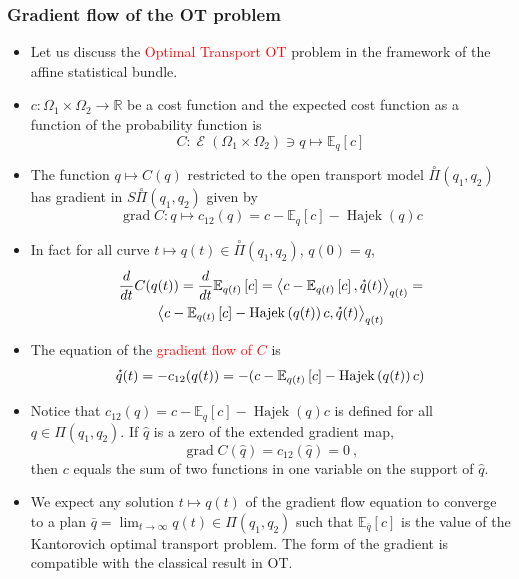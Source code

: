 \documentclass[xcolor=svgnames]{beamer}
\DeclareMathOperator{\Hajek}{Hajek}
\DeclareMathOperator{\Maxexp}{\mathcal E}
\DeclareMathOperator{\grad}{grad}
\newcommand{\derivby}[1]{\frac{d}{d#1}}
\newcommand{\expectat}[2]{\mathbb E_{#1}\left[#2\right]}
\newcommand{\hajekof}[1]{\Hajek\left(#1\right)}
\newcommand{\maxexpat}[1]{\Maxexp\left(#1\right)}
\newcommand{\openplan}[2]{\overset{\circ}\Pi\left(#1,#2\right)}
\newcommand{\reals}{\mathbb{R}}
\newcommand{\rosso}[1]{\textcolor{red}{#1}}
\newcommand{\scalarat}[3]{\left\langle#2,#3\right\rangle_{#1}}
\newcommand{\velocity}[1]{\accentset{\star}{#1}}
\renewcommand{\emph}{\rosso}
\begin{document}
\begin{frame}\small\frametitle{Gradient flow of the OT problem}

\begin{itemize}
    \item 
Let us discuss the \emph{Optimal Transport OT} problem in the framework of the affine statistical bundle.
\item $c \colon \Omega_1 \times \Omega_2 \to \reals$ be a cost function and the expected cost function as a function of the probability function is
\begin{equation*}
  C \colon \maxexpat {\Omega_1 \times \Omega_2} \ni q \mapsto \expectat q c
\end{equation*}
\item The function $q \mapsto C(q)$ restricted to the open transport model $\openplan{q_1}{q_2}$ has gradient in $S\openplan{q_1}{q_2}$ given by
\begin{equation*}
 \grad C \colon q \mapsto c_{12}(q) = c - \expectat q c - \hajekof q c 
\end{equation*}
\item In fact for all curve $t \mapsto q(t) \in \openplan {q_1}{q_2}$, $q(0) = q$,
\begin{multline*}
\derivby t C(q(t)) = \derivby t \expectat {q(t)} c = \scalarat {q(t)} {c - \expectat {q(t)} c}{\velocity q(t)} = \\
\scalarat {q(t)} {c - \expectat {q(t)} c - \hajekof {q(t)} c}{\velocity q(t)}
\end{multline*}

\item The equation of the \emph{gradient flow of $C$} is
\begin{equation*}
  \velocity q(t) = - c_{12}(q(t)) = - (c - \expectat {q(t)} c - \hajekof {q(t)} c)
\end{equation*}

\item Notice that  $c_{12}(q) = c - \expectat q c - \hajekof {q} c$ is defined for  all $q \in \Pi(q_1,q_2)$. If $\hat q$ is a zero of the extended gradient map,
\begin{equation*}
    \grad C(\hat q) = c_{12}(\hat q) = 0 \ ,
\end{equation*}
then $c$ equals the sum of two functions in one variable on the support of $\hat q$.
\item
We expect any solution $t \mapsto q(t)$ of the gradient flow equation to converge to a plan $\bar q = \lim_{t \to \infty} q(t) \in \Pi(q_1,q_2)$ such that $\expectat {\bar q} c$ is the value of the Kantorovich optimal transport problem. The form of the gradient is compatible with the classical result in OT.
\end{itemize}
\end{frame}
\end{document}
